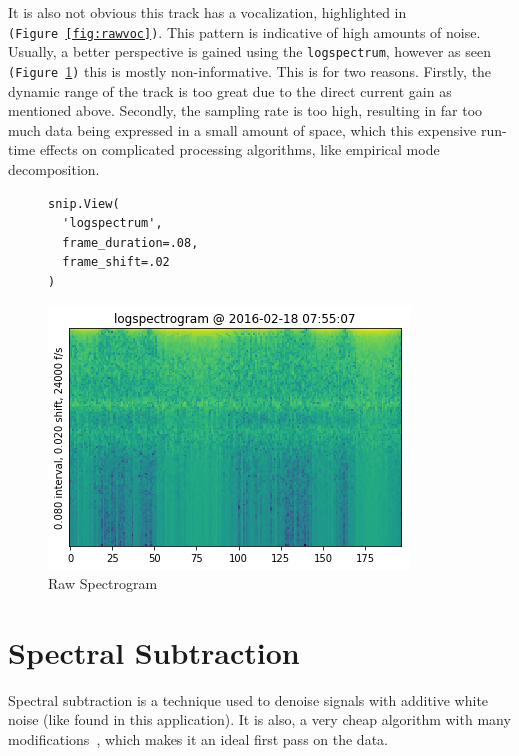 \documentclass{article}
\begin{document}
\begin{multicols}{2}
\begin{figure}[H]
\end{figure}

It is also not obvious this track has a vocalization, highlighted in \texttt{(Figure~\ref{fig:rawvoc})}. This pattern is indicative of high amounts of noise. Usually, a better perspective is gained using the \texttt{logspectrum}, however as seen \texttt{(Figure~\ref{fig:rawspec})} this is mostly non-informative. This is for two reasons. Firstly, the dynamic range of the track is too great due to the direct current gain as mentioned above. Secondly, the sampling rate is too high, resulting in far too much data being expressed in a small amount of space, which this expensive run-time effects on complicated processing algorithms, like empirical mode decomposition.

\begin{figure}[H]
  \centering
\begin{lstlisting}
snip.View(
  'logspectrum',
  frame_duration=.08,
  frame_shift=.02
)

\end{lstlisting}
  \includegraphics[width=\columnwidth]{./rawspec.png}
  \caption{Raw Spectrogram}
  \label{fig:rawspec}

\end{figure}

\section{Spectral Subtraction}

Spectral subtraction is a technique used to denoise signals with additive white noise (like found in this application). It is also, a very cheap algorithm with many modifications~\cite{specsub2008}, which makes it an ideal first pass on the data.


\end{multicols}
\end{document}
